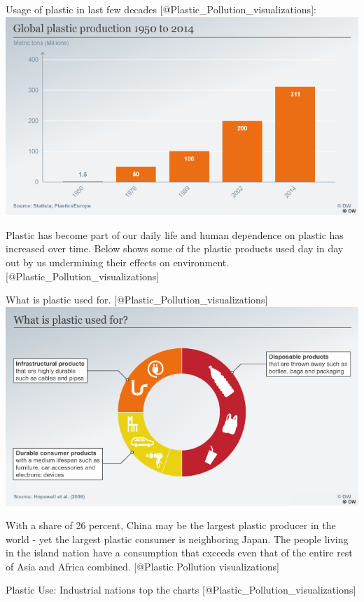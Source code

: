 \documentclass[]{book}
\theoremstyle{definition}
\theoremstyle{definition}
\theoremstyle{definition}
\theoremstyle{remark}
\begin{document}
Usage of plastic in last few decades
{[}@Plastic\_Pollution\_visualizations{]}:
\includegraphics{images/global_plastic_usage.png}

Plastic has become part of our daily life and human dependence on
plastic has increased over time. Below shows some of the plastic
products used day in day out by us undermining their effects on
environment. {[}@Plastic\_Pollution\_visualizations{]}

What is plastic used for. {[}@Plastic\_Pollution\_visualizations{]}
\includegraphics{images/use_of_plastic.png}

With a share of 26 percent, China may be the largest plastic producer in
the world - yet the largest plastic consumer is neighboring Japan. The
people living in the island nation have a consumption that exceeds even
that of the entire rest of Asia and Africa combined. {[}@Plastic
Pollution visualizations{]}

Plastic Use: Industrial nations top the charts
{[}@Plastic\_Pollution\_visualizations{]}
\end{document}
